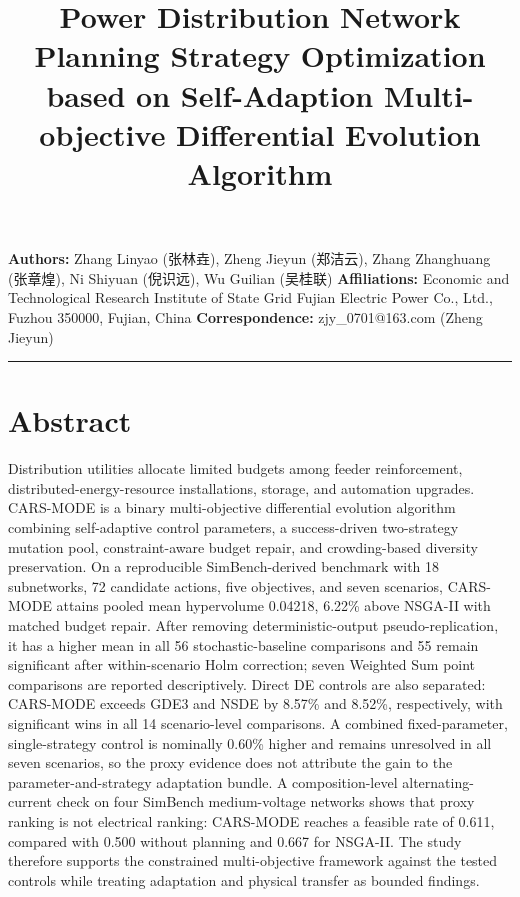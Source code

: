 \documentclass[
  10pt,
  a4paper,
]{article}
\title{Power Distribution Network Planning Strategy Optimization based on
Self-Adaption Multi-objective Differential Evolution Algorithm}
\author{}
\date{}
\begin{document}
\maketitle

{
\hypersetup{linkcolor=}
\setcounter{tocdepth}{3}
\tableofcontents
}
\textbf{Authors:} Zhang Linyao (张林垚), Zheng Jieyun (郑洁云),
Zhang Zhanghuang (张章煌), Ni Shiyuan (倪识远), Wu Guilian (吴桂联)
\textbf{Affiliations:} Economic and Technological Research Institute of
State Grid Fujian Electric Power Co., Ltd., Fuzhou 350000, Fujian, China
\textbf{Correspondence:} zjy\_0701@163.com (Zheng Jieyun)

\begin{center}\rule{0.5\linewidth}{0.5pt}\end{center}

\section{Abstract}\label{abstract}

Distribution utilities allocate limited budgets among feeder
reinforcement, distributed-energy-resource installations, storage, and
automation upgrades. CARS-MODE is a binary multi-objective differential
evolution algorithm combining self-adaptive control parameters, a
success-driven two-strategy mutation pool, constraint-aware budget
repair, and crowding-based diversity preservation. On a reproducible
SimBench-derived benchmark with 18 subnetworks, 72 candidate actions,
five objectives, and seven scenarios, CARS-MODE attains pooled mean
hypervolume 0.04218, 6.22\% above NSGA-II with matched budget repair.
After removing deterministic-output pseudo-replication, it has a higher
mean in all 56 stochastic-baseline comparisons and 55 remain significant
after within-scenario Holm correction; seven Weighted Sum point
comparisons are reported descriptively. Direct DE controls are also
separated: CARS-MODE exceeds GDE3 and NSDE by 8.57\% and 8.52\%,
respectively, with significant wins in all 14 scenario-level
comparisons. A combined fixed-parameter, single-strategy control is
nominally 0.60\% higher and remains unresolved in all seven scenarios,
so the proxy evidence does not attribute the gain to the
parameter-and-strategy adaptation bundle. A composition-level
alternating-current check on four SimBench medium-voltage networks shows
that proxy ranking is not electrical ranking: CARS-MODE reaches a
feasible rate of 0.611, compared with 0.500 without planning and 0.667
for NSGA-II. The study therefore supports the constrained
multi-objective framework against the tested controls while treating
adaptation and physical transfer as bounded findings.
\end{document}
